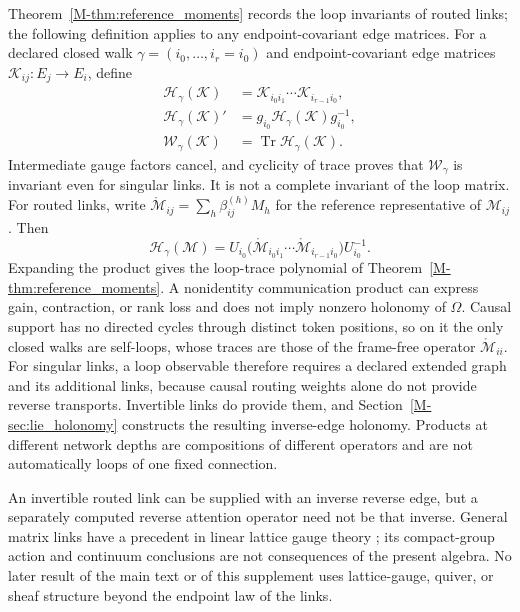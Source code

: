 \documentclass[twoside,11pt]{article}
\begin{document}
Theorem~\ref{M-thm:reference_moments} records the loop invariants of routed links; the following definition applies to any endpoint-covariant edge matrices. For a declared closed walk \(\gamma=(i_0,\ldots,i_r=i_0)\) and endpoint-covariant edge matrices \(\mathcal K_{ij}:E_j\to E_i\), define
\begin{align}
\mathcal H_\gamma(\mathcal K)&=\mathcal K_{i_0i_1}\cdots\mathcal K_{i_{r-1}i_0},\\
\mathcal H_\gamma(\mathcal K)'&=g_{i_0}\mathcal H_\gamma(\mathcal K)g_{i_0}^{-1},\\
\mathcal W_\gamma(\mathcal K)&=\operatorname{Tr}\mathcal H_\gamma(\mathcal K).
\label{eq:main_matrix_loop_trace}
\end{align}
Intermediate gauge factors cancel, and cyclicity of trace proves that \(\mathcal W_\gamma\) is invariant even for singular links. It is not a complete invariant of the loop matrix. For routed links, write \(\mathring{\mathcal M}_{ij}=\sum_h\beta_{ij}^{(h)}M_h\) for the reference representative of $\mathcal M_{ij}$. Then
\begin{equation}
\mathcal H_\gamma(\mathcal M)
=U_{i_0}\bigl(\mathring{\mathcal M}_{i_0i_1}\cdots\mathring{\mathcal M}_{i_{r-1}i_0}\bigr)U_{i_0}^{-1}.
\label{eq:main_routed_loop_body}
\end{equation}
Expanding the product gives the loop-trace polynomial of Theorem~\ref{M-thm:reference_moments}. A nonidentity communication product can express gain, contraction, or rank loss and does not imply nonzero holonomy of \(\Omega\). Causal support has no directed cycles through distinct token positions, so on it the only closed walks are self-loops, whose traces are those of the frame-free operator \(\mathring{\mathcal M}_{ii}\). For singular links, a loop observable therefore requires a declared extended graph and its additional links, because causal routing weights alone do not provide reverse transports. Invertible links do provide them, and Section~\ref{M-sec:lie_holonomy} constructs the resulting inverse-edge holonomy. Products at different network depths are compositions of different operators and are not automatically loops of one fixed connection.

An invertible routed link can be supplied with an inverse reverse edge, but a separately computed reverse attention operator need not be that inverse. General matrix links have a precedent in linear lattice gauge theory \citep{Wetterich2014LinearLattice}; its compact-group action and continuum conclusions are not consequences of the present algebra. No later result of the main text or of this supplement uses lattice-gauge, quiver, or sheaf structure beyond the endpoint law of the links.
\end{document}
